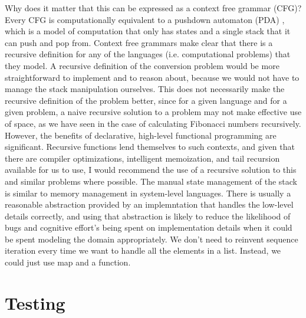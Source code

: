 \documentclass[10pt,letterpaper,final]{report}
\begin{document}
Why does it matter that this can be expressed as a context free grammar (CFG)? Every CFG is computationally equivalent to a pushdown automaton (PDA) \cite{sipser2013}, which is a model of computation that only has states and a single stack that it can push and pop from. Context free grammars make clear that there is a recursive definition for any of the languages (i.e. computational problems) that they model. A recursive definition of the conversion problem would be more straightforward to implement and to reason about, because we would not have to manage the stack manipulation ourselves. This does not necessarily make the recursive definition of the problem better, since for a given language and for a given problem, a naive recursive solution to a problem may not make effective use of space, as we have seen in the case of calculating Fibonacci numbers recursively. However, the benefits of declarative, high-level functional programming are significant. Recursive functions lend themselves to such contexts, and given that there are compiler optimizations, intelligent memoization, and tail recursion available for us to use, I would recommend the use of a recursive solution to this and similar problems where possible. The manual state management of the stack is similar to memory management in system-level languages. There is usually a reasonable abstraction provided by an implemntation that handles the low-level details correctly, and using that abstraction is likely to reduce the likelihood of bugs and cognitive effort's being spent on implementation details when it could be spent modeling the domain appropriately. We don't need to reinvent sequence iteration every time we want to handle all the elements in a list. Instead, we could just use map and a function.

\pagebreak

\section{Testing}\label{sec:testing}
\end{document}
